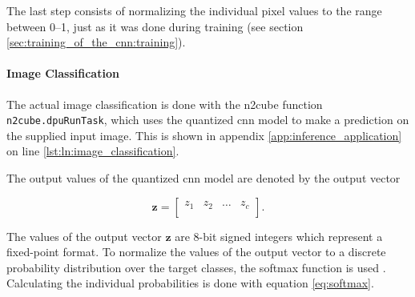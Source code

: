 The last step consists of normalizing the individual pixel values to the range between \numrange{0}{1}, just as it was done during training (see section \ref{sec:training_of_the_cnn:training}).

\paragraph{Image Classification}
The actual image classification is done with the \acrshort{n2cube} function \texttt{n2cube.dpuRunTask}, which uses the quantized \acrshort{cnn} model to make a prediction on the supplied input image.
This is shown in appendix \ref{app:inference_application} on line \ref{lst:ln:image_classification}.

The output values of the quantized \acrshort{cnn} model are denoted by the output vector

\begin{equation}
  \boldsymbol{z} =
  \begin{bmatrix}
    z_1 & z_2 & \dots & z_c \\
  \end{bmatrix}.
  \label{eq:output_vector}
\end{equation}

The values of the output vector $\boldsymbol{z}$ are 8-bit signed integers which represent a fixed-point format.
To normalize the values of the output vector to a discrete probability distribution over the target classes, the softmax function is used \cite{inf_softmax}.
Calculating the individual probabilities is done with equation \ref{eq:softmax}.

